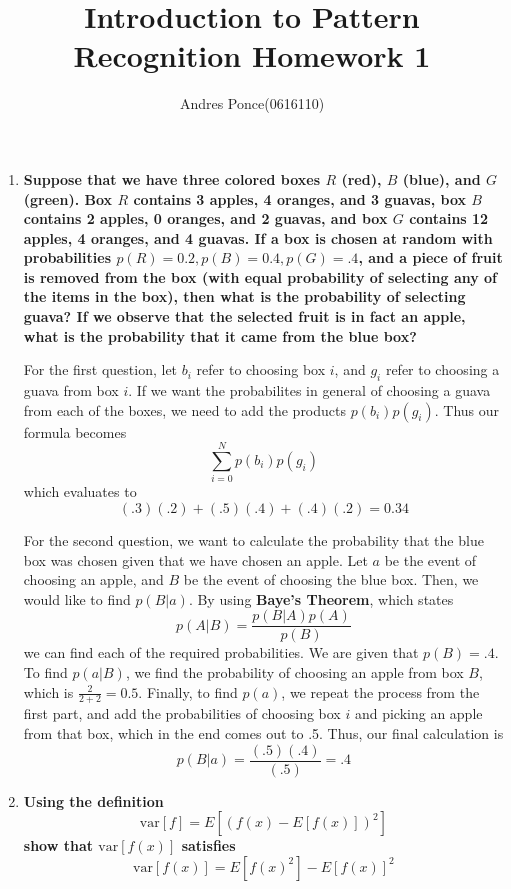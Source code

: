 \documentclass{article}
\title{Introduction to Pattern Recognition Homework 1}
\author{Andres Ponce(0616110)}
\begin{document}
\maketitle

\begin{enumerate}
	\item 
		\textbf{Suppose that we have three colored boxes $R$ (red), $B$ (blue),
				and $G$ (green). Box $R$ contains 3 apples, 4 oranges, and 3 guavas,
				box $B$ contains 2 apples, 0 oranges, and 2 guavas, and box $G$ contains
				12 apples, 4 oranges, and 4 guavas. If a box is chosen at random with 
				probabilities $p(R)=0.2,p(B)=0.4,p(G)=.4$, and a piece of fruit is removed
				from the box (with equal probability of selecting any of the items in the box),
				then what is the probability of selecting guava? If we observe that the selected
				fruit is in fact an apple, what is the probability that it came from the blue box?}

		For the first question, let $b_{i}$ refer to choosing box $i$, and $g_{i}$ refer 
		to choosing a guava from box $i$. If we want the probabilites in general of choosing
		a guava from each of the boxes, we need to add the products $p(b_{i})p(g_{i})$. Thus 
		our formula becomes 
				\[ \sum_{i=0}^{N}p(b_{i})p(g_{i})\]
		which evaluates to 
				\[(.3)(.2) + (.5)(.4) + (.4)(.2) = 0.34\]
		
		For the second question, we want to calculate the probability that the blue box was chosen
		given that we have chosen an apple. Let $a$ be the event of choosing an apple, and $B$ be
		the event of choosing the blue box. Then, we would like to find $p(B|a)$. By using
		\textbf{Baye's Theorem}, which states
		\[ p(A|B) = \frac{p(B|A)p(A)}{p(B)}\]
		we can find each of the required probabilities. We are given that $p(B) = .4$. To find
		$p(a|B)$, we find the probability of choosing an apple from box $B$, which is 
		$\frac{2}{2+2} = 0.5$. Finally, to find $p(a)$, we repeat the process from the first part,
		and add the probabilities of choosing box $i$ and picking an apple from that box, which in the
		end comes out to .5. Thus, our final calculation is 
				\[ p(B|a) = \frac{(.5)(.4)}{(.5)} = .4\]


		\item
		\textbf{Using the definition} \[\textrm{var}[f] = E[(f(x) - E[f(x)])^{2}] \]
		\textbf{show that $\textrm{var}[f(x)]$ satisfies}
		\[\textrm{var}[f(x)] = E[f(x)^{2}] - E[f(x)]^{2}\]

\end{enumerate}
\end{document}

